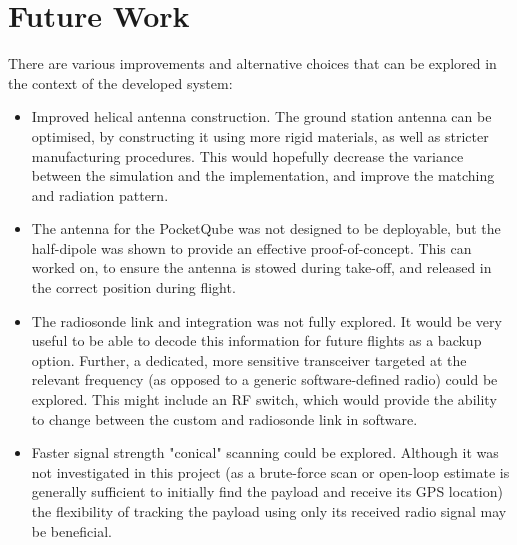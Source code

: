\section{Future Work}

There are various improvements and alternative choices that can be explored in the context of the developed system:
\begin{itemize}
    \item Improved helical antenna construction. The ground station antenna can be optimised, by constructing it using more rigid materials, as well as stricter manufacturing procedures. This would hopefully decrease the variance between the simulation and the implementation, and improve the matching and radiation pattern.
    \item The antenna for the PocketQube was not designed to be deployable, but the half-dipole was shown to provide an effective proof-of-concept. This can worked on, to ensure the antenna is stowed during take-off, and released in the correct position during flight.
    \item The radiosonde link and integration was not fully explored. It would be very useful to be able to decode this information for future flights as a backup option. Further, a dedicated, more sensitive transceiver targeted at the relevant frequency (as opposed to a generic software-defined radio) could be explored. This might include an RF switch, which would provide the ability to change between the custom and radiosonde link in software.
    \item Faster signal strength "conical" scanning could be explored. Although it was not investigated in this project (as a brute-force scan or open-loop estimate is generally sufficient to initially find the payload and receive its GPS location) the flexibility of tracking the payload using only its received radio signal may be beneficial.
\end{itemize}